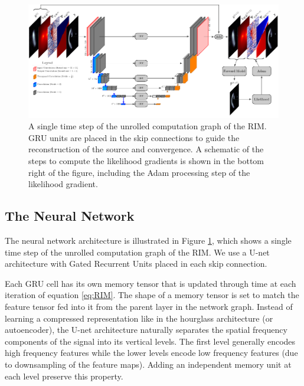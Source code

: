 \begin{figure}[ht!]
        \centering
        \includegraphics[width=\textwidth]{figures/unet_architecture.pdf}
        \caption{
A single time step of the unrolled computation graph of the RIM.
GRU units are placed in the skip connections to guide the 
reconstruction of the source and convergence. A schematic of the steps to compute 
the likelihood gradients is shown in the bottom right of the figure, including the 
Adam processing step of the likelihood gradient.}
        \label{fig:unet}
\end{figure}

\subsection{The Neural Network}\label{sec:gradient model}


The neural network architecture is illustrated in Figure \ref{fig:unet}, which shows 
a single time step of the unrolled computation graph of the RIM.
We use a U-net \citep{Ronneberger2015} architecture 
with Gated Recurrent Units \citep[GRU:][]{Cho2014} placed in each skip connection. 

Each GRU cell has its own memory tensor that is updated through time at each iteration of 
equation \ref{eq:RIM}. The shape of a memory tensor is set to match the
feature tensor fed into it from the parent layer in the network graph. 
Instead of learning a compressed representation like in the hourglass
architecture (or autoencoder), the U-net architecture naturally separates the spatial 
frequency components of the signal into its vertical levels. The first level generally encodes 
high frequency features while the lower levels encode low frequency features (due to downsampling of the feature maps). 
Adding an independent memory unit 
at each level preserve this property.

